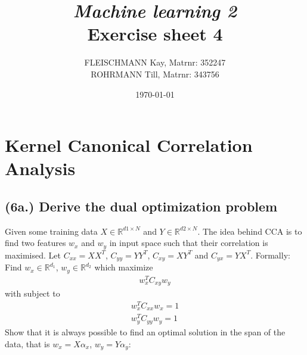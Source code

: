 \documentclass[a4paper, 12pt, titlepage]{article}
\title
{{\em Machine learning 2}\\
Exercise sheet 4}
\author{FLEISCHMANN Kay, Matrnr: 352247\\
	ROHRMANN Till, Matrnr: 343756}
\date{\today}
\begin{document}
\maketitle

\setcounter{section}{5}


\section{Kernel Canonical Correlation Analysis}

\subsection*{(6a.) Derive the dual optimization problem}
Given some training data $X \in \mathbb{R}^{d1 \times N} $ and $Y \in \mathbb{R}^{d2 \times N}$. 
The idea behind CCA is to find two features $w_x$ and $w_y$ in input space such that their correlation is maximised.
Let $C_{xx} = XX^T$, $C_{yy} = YY^T$, $C_{xy} = XY^T$ and $C_{yx} = YX^T$.
\newline \newline
Formally: Find $w_x \in \mathbb{R}^{d_1}$, $w_y \in \mathbb{R}^{d_2}$ which maximize
\begin{eqnarray}
  w^{T}_{x} C_{xy}w_y \label{eq:prob}
 \end{eqnarray}
with subject to
\begin{eqnarray}
  w^T_xC_{xx}w_x=1 \label{eq:constraint1}\\
  w^T_yC_{yy}w_y=1 \label{eq:constraint2}
\end{eqnarray}
Show that it is always possible to find an optimal solution in the span of the data, that is $w_x= X \alpha_x$, $w_y = Y \alpha_y$:
\end{document}
